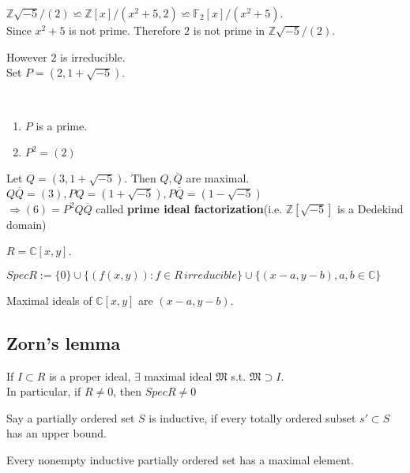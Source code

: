 \begin{example}
    $ \mathbb{Z}\sqrt{-5}/(2)\backsimeq \mathbb{Z}[x]/(x^2+5,2)\backsimeq \mathbb{F}_2[x]/(x^2+5) $.\\
    Since  $ x^2+5 $ is not prime. Therefore   $ 2  $ is not prime in  $ \mathbb{Z}\sqrt{-5}/(2) $.
\end{example}
\begin{example}
    However  $ 2  $ is irreducible.\\
    Set  $ P=(2,1+\sqrt{-5}) $.
    \begin{claim}\,
        \begin{enumerate}
            \item  $ P  $ is a prime.
            \item  $ P^2=(2) $ 
        \end{enumerate}
    \end{claim} 
    Let  $ Q=(3,1+\sqrt{-5}) $. Then  $ Q,\overline{Q}  $ are maximal.\\  $ Q\overline{Q}=(3),PQ=(1+\sqrt{-5}),P\overline{Q}=(1-\sqrt{-5})$\\
     $ \Rightarrow (6)=P^2Q\overline{Q} $ called \textbf{prime ideal factorization}(i.e.  $ \mathbb{Z}[\sqrt{-5}] $ is a Dedekind domain)
\end{example}
\begin{example}
     $ R=\mathbb{C}[x,y] $.\\
    \begin{fact}
         $ Spec R:=\{0\}\cup \{(f(x,y)):f\in R\,irreducible\}\cup\{(x-a,y-b),a,b\in \mathbb{C} \} $ 
    \end{fact}
\end{example}
\begin{theorem}
    Maximal ideals of  $ \mathbb{C}[x,y] $  are  $ (x-a,y-b) $. 
\end{theorem}
\subsection{Zorn's lemma}
\begin{theorem}
    If  $ I\subset R  $ is a proper ideal,  $ \exists   $ maximal ideal  $ \mathfrak{M} $ s.t.  $ \mathfrak{M}\supset I $.\\
    In particular, if  $ R\not=0  $, then  $ Spec R\not=0 $  
\end{theorem}
\begin{definition}
    Say a partially ordered set  $ S  $ is inductive, if every totally ordered subset  $ s'\subset S  $ has an upper bound.
\end{definition}
\begin{theorem}
    Every nonempty inductive partially ordered set has a maximal element.
\end{theorem}